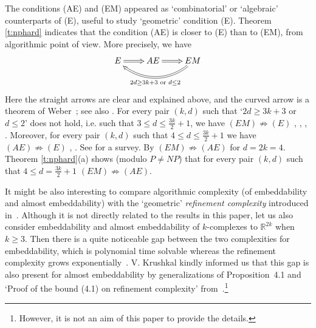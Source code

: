 \documentclass[runningheads]{llncs}
\theoremstyle{remark}
\theoremstyle{definition}
\newcommand{\R}{\mathbb{R}}
\begin{document}
The conditions (AE) and (EM) appeared as `combinatorial' or `algebraic' counterparts of (E), useful to study `geometric' condition (E).
Theorem \ref{t:nphard} indicates that the condition (AE) is closer to (E) than to (EM), from algorithmic point of view.
More precisely, we have
$$\xymatrix{ E \ar@{=>}[r]_{} & AE \ar@{=>}[r]_{}  & EM \ar@{=>}@(dl,dr)[ll]^{2d\ge3k+3\text{ or }d\le2}}$$
Here the straight arrows are clear and explained above, and the curved arrow is
a theorem of Weber~\cite{We67}; see also \cite[\S5]{Sk08}.
For every pair $(k,d)$ such that `$2d\ge3k+3$ or $d\le2$' does not hold, i.e. such that  $3\le d\le \frac{3k}2+1$, we have $(EM)\not\Rightarrow(E)$ \cite{SeSp92}, \cite{FKT}, \cite{SSS}, \cite{GS06}.
Moreover, for every pair $(k,d)$ such that $4\le d\le \frac{3k}2+1$
we have $(AE)\not\Rightarrow(E)$ \cite{SeSp92}, \cite{SSS}.
See \cite[\S5, \S7]{Sk08} for a survey.
By \cite[Theorem 1.5 and Proposition 1.7]{AMSW} $(EM)\not\Rightarrow(AE)$ for $d=2k=4$.
Theorem \ref{t:nphard}(a) shows (modulo $P\ne NP$) that for every pair $(k,d)$ such that $4\le d=\frac{3k}2+1$
$(EM)\not\Rightarrow(AE)$.

It might be also interesting to compare algorithmic complexity (of embeddability and almost embeddability) with the `geometric' \emph{refinement complexity} introduced in~\cite{FK}.
Although it is not directly related to the results in this paper, let us
also consider embeddability and almost embeddability of $k$-complexes to $\R^{2k}$ when $k \geq 3$. 
Then there is a quite noticeable gap between the two complexities for embeddability, which is polynomial time solvable whereas the refinement complexity grows exponentially~\cite{FK}. 
V. Krushkal kindly informed us that this gap is also present for almost
embeddability by generalizations of Proposition~4.1 and `Proof of the bound
(4.1) on refinement complexity' from~\cite{FK}.\footnote{However, it is not an
aim of this paper to provide the details.}
\end{document}

